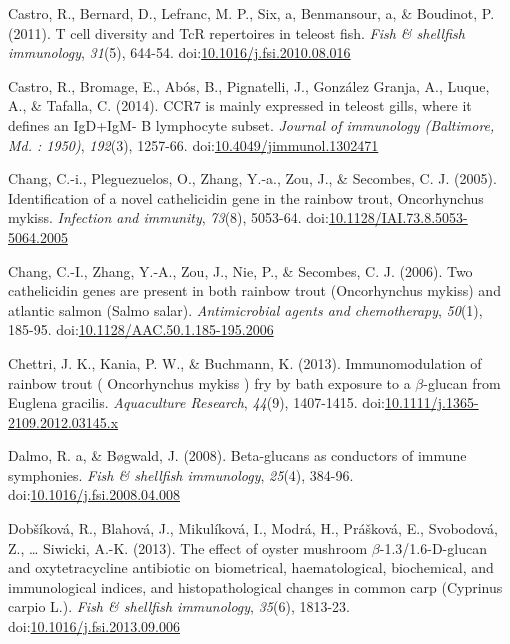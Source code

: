 \documentclass[12pt,letterpaper,oneside]{scrbook}
\begin{document}
Castro, R., Bernard, D., Lefranc, M. P., Six, a, Benmansour, a, \&
Boudinot, P. (2011). T cell diversity and TcR repertoires in teleost
fish. \emph{Fish \& shellfish immunology}, \emph{31}(5), 644-54.
doi:\href{http://dx.doi.org/10.1016/j.fsi.2010.08.016}{10.1016/j.fsi.2010.08.016}

Castro, R., Bromage, E., Abós, B., Pignatelli, J., {González Granja},
A., Luque, A., \& Tafalla, C. (2014). CCR7 is mainly expressed in
teleost gills, where it defines an IgD+IgM- B lymphocyte subset.
\emph{Journal of immunology (Baltimore, Md. : 1950)}, \emph{192}(3),
1257-66.
doi:\href{http://dx.doi.org/10.4049/jimmunol.1302471}{10.4049/jimmunol.1302471}

Chang, C.-i., Pleguezuelos, O., Zhang, Y.-a., Zou, J., \& Secombes, C.
J. (2005). Identification of a novel cathelicidin gene in the rainbow
trout, Oncorhynchus mykiss. \emph{Infection and immunity}, \emph{73}(8),
5053-64.
doi:\href{http://dx.doi.org/10.1128/IAI.73.8.5053-5064.2005}{10.1128/IAI.73.8.5053-5064.2005}

Chang, C.-I., Zhang, Y.-A., Zou, J., Nie, P., \& Secombes, C. J. (2006).
Two cathelicidin genes are present in both rainbow trout (Oncorhynchus
mykiss) and atlantic salmon (Salmo salar). \emph{Antimicrobial agents
and chemotherapy}, \emph{50}(1), 185-95.
doi:\href{http://dx.doi.org/10.1128/AAC.50.1.185-195.2006}{10.1128/AAC.50.1.185-195.2006}

Chettri, J. K., Kania, P. W., \& Buchmann, K. (2013). Immunomodulation
of rainbow trout ( Oncorhynchus mykiss ) fry by bath exposure to a
\(\beta\)-glucan from Euglena gracilis. \emph{Aquaculture Research},
\emph{44}(9), 1407-1415.
doi:\href{http://dx.doi.org/10.1111/j.1365-2109.2012.03145.x}{10.1111/j.1365-2109.2012.03145.x}

Dalmo, R. a, \& Bøgwald, J. (2008). Beta-glucans as conductors of immune
symphonies. \emph{Fish \& shellfish immunology}, \emph{25}(4), 384-96.
doi:\href{http://dx.doi.org/10.1016/j.fsi.2008.04.008}{10.1016/j.fsi.2008.04.008}

Dobšíková, R., Blahová, J., Mikulíková, I., Modrá, H., Prášková, E.,
Svobodová, Z., \ldots{} Siwicki, A.-K. (2013). The effect of oyster
mushroom \(\beta\)-1.3/1.6-D-glucan and oxytetracycline antibiotic on
biometrical, haematological, biochemical, and immunological indices, and
histopathological changes in common carp (Cyprinus carpio L.).
\emph{Fish \& shellfish immunology}, \emph{35}(6), 1813-23.
doi:\href{http://dx.doi.org/10.1016/j.fsi.2013.09.006}{10.1016/j.fsi.2013.09.006}
\end{document}
